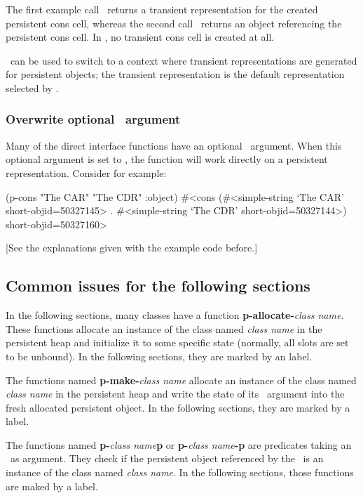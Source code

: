 The first example call \oi\ returns a transient representation for the
created persistent cons cell, whereas the second call \oii\ returns an
object referencing the persistent cons cell. In \oii, no transient
cons cell is created at all.

\ can be used to switch to a
context where transient representations are generated for persistent
objects; the transient representation is the default representation
selected by \plobwoexcl.

\subsubsection{Overwrite optional \protect{}\ argument}

Many of the direct interface functions have an optional
\ argument. When this optional argument is set to
, the function will work directly on a persistent
representation. Consider for example:
\begin{IndentedCompactCode}
\listener{}(p-cons "The CAR" "The CDR" :object)\marginnumber{\smalloii}
#<cons (#<simple-string `The CAR' short-objid=50327145> .
        #<simple-string `The CDR' short-objid=50327144>)
        short-objid=50327160>
\end{IndentedCompactCode}

[See the explanations given with the example code before.]

\subsection{Common issues for the following sections}

In the following sections, many classes have a function
\textbf{p-allocate-}\emph{\lt{}class name\gt}. These functions
allocate an instance of the class named \emph{\lt{}class name\gt} in
the persistent heap and initialize it to some specific state
(normally, all slots are set to be unbound). In the following
sections, they are marked by an \textbf{\AllocatorLabel} label.

The functions named \textbf{p-make-}\emph{\lt{}class name\gt} allocate
an instance of the class named \emph{\lt{}class name\gt} in the
persistent heap and write the state of its \ argument
into the fresh allocated persistent object.  In the following
sections, they are marked by a \textbf{\CreatorLabel} label.

The functions named \textbf{p-}\emph{\lt{}class name\gt}\textbf{p} or
\textbf{p-}\emph{\lt{}class name\gt}\textbf{-p} are predicates taking
an \objid\ as argument. They check if the persistent object referenced
by the \objid\ is an instance of the class named \emph{\lt{}class
  name\gt}. In the following sections, those functions are maked by a
\textbf{\TypePredicateLabel} label.

